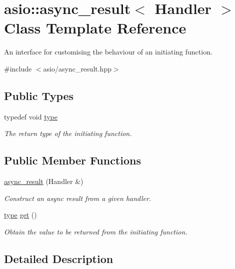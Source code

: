 \hypertarget{classasio_1_1async__result}{}\section{asio\+:\+:async\+\_\+result$<$ Handler $>$ Class Template Reference}
\label{classasio_1_1async__result}


An interface for customising the behaviour of an initiating function.  




{\ttfamily \#include $<$asio/async\+\_\+result.\+hpp$>$}

\subsection*{Public Types}
\begin{DoxyCompactItemize}
\item 
typedef void \hyperlink{classasio_1_1async__result_ac7d274968af729b26f7cb3de62bf4eb7}{type}
\begin{DoxyCompactList}\small\item\em The return type of the initiating function. \end{DoxyCompactList}\end{DoxyCompactItemize}
\subsection*{Public Member Functions}
\begin{DoxyCompactItemize}
\item 
\hyperlink{classasio_1_1async__result_a082cebe0e7344a7088415ed587abdc4e}{async\+\_\+result} (Handler \&)
\begin{DoxyCompactList}\small\item\em Construct an async result from a given handler. \end{DoxyCompactList}\item 
\hyperlink{classasio_1_1async__result_ac7d274968af729b26f7cb3de62bf4eb7}{type} \hyperlink{classasio_1_1async__result_a5f1b8e864e413d3c34888883a63eab73}{get} ()
\begin{DoxyCompactList}\small\item\em Obtain the value to be returned from the initiating function. \end{DoxyCompactList}\end{DoxyCompactItemize}


\subsection{Detailed Description}
